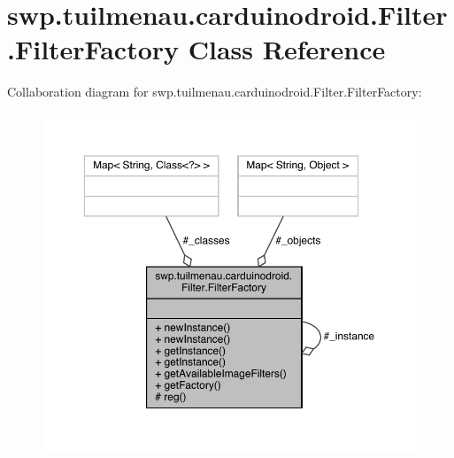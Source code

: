 \hypertarget{classswp_1_1tuilmenau_1_1carduinodroid_1_1_filter_1_1_filter_factory}{}\section{swp.\+tuilmenau.\+carduinodroid.\+Filter.\+Filter\+Factory Class Reference}
\label{classswp_1_1tuilmenau_1_1carduinodroid_1_1_filter_1_1_filter_factory}


Collaboration diagram for swp.\+tuilmenau.\+carduinodroid.\+Filter.\+Filter\+Factory\+:
\nopagebreak
\begin{figure}[H]
\begin{center}
\leavevmode
\includegraphics[width=350pt]{classswp_1_1tuilmenau_1_1carduinodroid_1_1_filter_1_1_filter_factory__coll__graph}
\end{center}
\end{figure}
